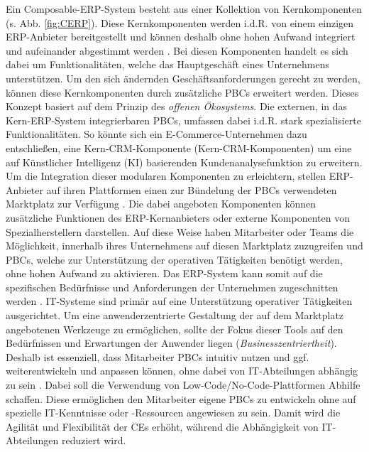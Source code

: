 Ein Composable-ERP-System besteht aus einer Kollektion von Kernkomponenten (s. Abb. \ref{fig:CERP}). Diese Kernkomponenten werden i.d.R. von einem einzigen ERP-Anbieter bereitgestellt und können deshalb ohne hohen Aufwand integriert und aufeinander abgestimmt werden \cite{.d}. Bei diesen Komponenten handelt es sich dabei um Funktionalitäten, welche das Hauptgeschäft eines Unternehmens unterstützen. Um den sich ändernden Geschäftsanforderungen gerecht zu werden, können diese Kernkomponenten durch zusätzliche PBCs erweitert werden. Dieses Konzept basiert auf dem Prinzip des \textit{offenen Ökosystems}. Die externen, in das Kern-ERP-System integrierbaren PBCs, umfassen dabei i.d.R. stark spezialisierte Funktionalitäten. So könnte sich ein E-Commerce-Unternehmen dazu entschließen, eine Kern-\acl{CRM}-Komponente (Kern-CRM-Komponenten) um eine auf Kün\-stlicher Intelligenz (\acs{KI}) basierenden Kundenanalysefunktion zu erweitern. Um die Integration dieser modularen Komponenten zu erleichtern, stellen ERP-Anbieter auf ihren Plattformen einen zur Bündelung der PBCs verwendeten Marktplatz zur Verfügung \cite{.d}. Die dabei angeboten Komponenten können zusätzliche Funktionen des ERP-Kern\-anbieters oder externe Komponenten von Spezialherstellern darstellen. Auf diese Weise haben Mitarbeiter oder Teams die Möglichkeit, innerhalb ihres Unternehmens auf diesen Marktplatz zuzugreifen und PBCs, welche zur Unterstützung der operativen Tätigkeiten benötigt werden, ohne hohen Aufwand zu aktivieren. Das ERP-System kann somit auf die spezifischen Bedürfnisse und Anforderungen der Unternehmen zugeschnitten werden \cite{.20230313}. IT-Systeme sind primär auf eine Unterstützung operativer Tätigkeiten ausgerichtet. Um eine anwenderzentrierte Gestaltung der auf dem Marktplatz angebotenen Werkzeuge zu ermöglichen, sollte der Fokus dieser Tools auf den Bedürfnissen und Erwartungen der Anwender liegen (\textit{Businesszentriertheit}). Deshalb ist essenziell, dass Mitarbeiter PBCs intuitiv nutzen und ggf. weiterentwickeln und anpassen können, ohne dabei von IT-Abteilungen abhängig zu sein \cite{.20230313}. Dabei soll die Verwendung von Low-Code/No-Code-Plattformen Abhilfe schaffen. Diese ermöglichen den Mitarbeiter eigene PBCs zu entwickeln ohne auf spezielle IT-Kenntnisse oder -Ressourcen angewiesen zu sein. Damit wird die Agilität und Flexibilität der CEs erhöht, während die Abhängigkeit von IT-Abteilungen reduziert wird.

